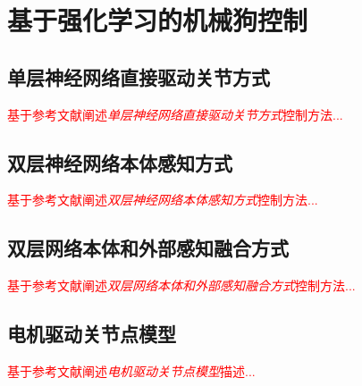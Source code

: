 
\chapter{基于强化学习的机械狗控制}

\section[单层神经网络直接驱动关节方式]{\label{section:direct_network}单层神经网络直接驱动关节方式\cite[p3]{Hwangbo_Lee_Dosovitskiy_Bellicoso_Tsounis_Koltun_Hutter_2019}}

\textcolor{red}{\small
基于参考文献阐述\emph{单层神经网络直接驱动关节方式}控制方法...
}

\section[双层神经网络本体感知方式]{双层神经网络本体感知方式\cite[p8]{Hwangbo_Lee_Dosovitskiy_Bellicoso_Tsounis_Koltun_Hutter_2019}}

\textcolor{red}{\small
基于参考文献阐述\emph{双层神经网络本体感知方式}控制方法...
}

\section[双层网络本体和外部感知融合方式]{双层网络本体和外部感知融合方式\cite[p7]{Lee_Hwangbo_Wellhausen_Koltun_Hutter_2020}}

\textcolor{red}{\small
基于参考文献阐述\emph{双层网络本体和外部感知融合方式}控制方法...
}

\section[电机驱动关节点模型]{电机驱动关节点模型\cite[p4]{Gehring_Coros_Hutter_Bellicoso_Heijnen_Diethelm_Bloesch_Fankhauser_Hwangbo_Hoepflinger_et_al_2016}}

\textcolor{red}{\small
基于参考文献阐述\emph{电机驱动关节点模型}描述...
}

